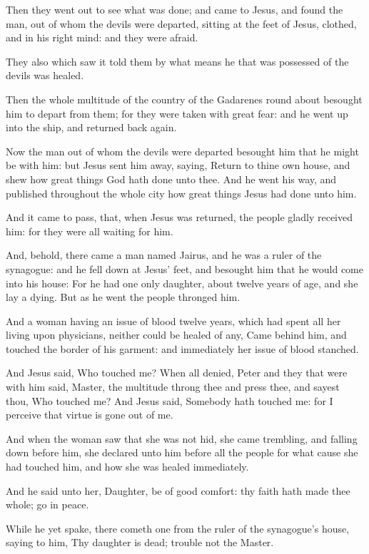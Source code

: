 \Verse Then they went out to see what was done; and came to Jesus, and found the man, out of whom the devils were departed, sitting at the feet of Jesus, clothed, and in his right mind: and they were afraid.

\Verse They also which saw it told them by what means he that was possessed of the devils was healed.

\Verse Then the whole multitude of the country of the Gadarenes round about besought him to depart from them; for they were taken with great fear: and he went up into the ship, and returned back again.

\Verse Now the man out of whom the devils were departed besought him that he might be with him: but Jesus sent him away, saying, \Verse Return to thine own house, and shew how great things God hath done unto thee. And he went his way, and published throughout the whole city how great things Jesus had done unto him.

\Verse And it came to pass, that, when Jesus was returned, the people gladly received him: for they were all waiting for him.

\Verse And, behold, there came a man named Jairus, and he was a ruler of the synagogue: and he fell down at Jesus' feet, and besought him that he would come into his house: \Verse For he had one only daughter, about twelve years of age, and she lay a dying. But as he went the people thronged him.

\Verse And a woman having an issue of blood twelve years, which had spent all her living upon physicians, neither could be healed of any, \Verse Came behind him, and touched the border of his garment: and immediately her issue of blood stanched.

\Verse And Jesus said, Who touched me? When all denied, Peter and they that were with him said, Master, the multitude throng thee and press thee, and sayest thou, Who touched me?  \Verse And Jesus said, Somebody hath touched me: for I perceive that virtue is gone out of me.

\Verse And when the woman saw that she was not hid, she came trembling, and falling down before him, she declared unto him before all the people for what cause she had touched him, and how she was healed immediately.

\Verse And he said unto her, Daughter, be of good comfort: thy faith hath made thee whole; go in peace.

\Verse While he yet spake, there cometh one from the ruler of the synagogue's house, saying to him, Thy daughter is dead; trouble not the Master.

